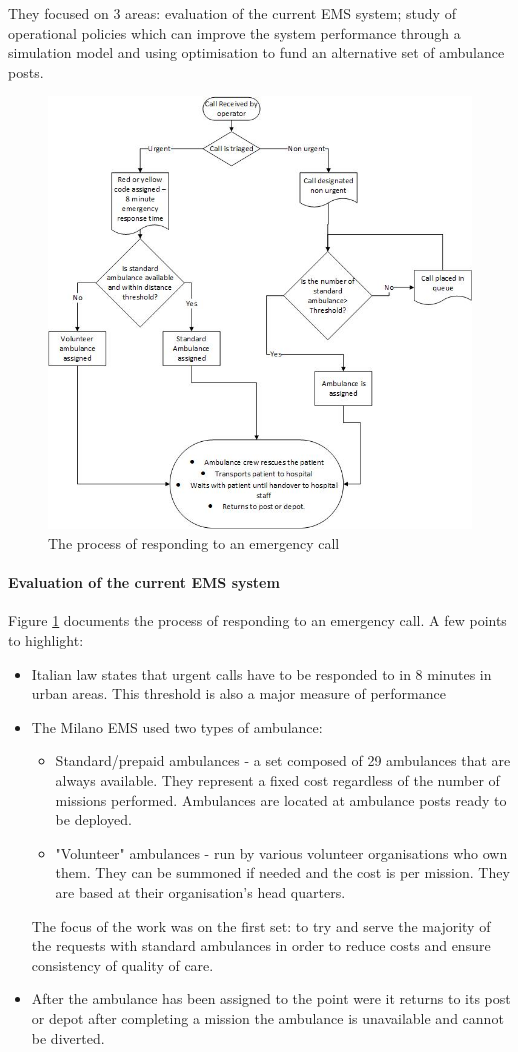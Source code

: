 \documentclass[11pt]{article} %
\begin{document}
	They focused on 3 areas: evaluation of the current EMS system; study of operational policies which can improve the system performance through a simulation model and using optimisation to fund an alternative set of ambulance posts. 
	\begin{figure}
		\centering
		\includegraphics[width=0.9\linewidth]{Report_images/MilanEMS}
		\caption{The process of responding to an emergency call}
		\label{fig:milanems}
	\end{figure}
\paragraph{Evaluation of the current EMS system }
	Figure \ref{fig:milanems} documents  the process of responding to an emergency call. A few points to highlight: 
	\begin{itemize}
		\item Italian law states that urgent calls have to be responded to in 8 minutes in urban areas. This threshold is also a major measure of performance 
		\item The Milano EMS used two types of ambulance: 
		\begin{itemize}
			\item Standard/prepaid ambulances - a set composed of 29 ambulances that are always available. They represent a fixed cost regardless of the number of missions performed. Ambulances are located at ambulance posts ready to be deployed.
			\item "Volunteer" ambulances - run by various volunteer organisations who own them. They can be summoned if needed and the cost is per mission. They are based at their organisation's head quarters.
		\end{itemize}
		The focus of the work was on the first set: to try and serve the majority of the requests with standard ambulances in order to reduce costs and ensure consistency of quality of care. 
		\item After the ambulance has been assigned to the point were it returns to its post or depot after completing a mission the ambulance is unavailable and cannot be diverted. 
	\end{itemize}
\end{document}

